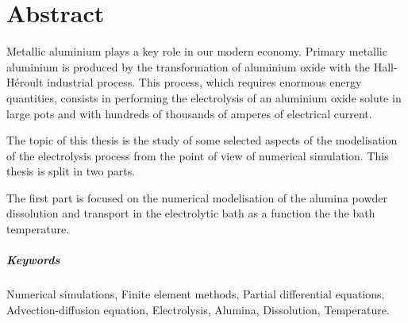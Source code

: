 \makeatletter
\@openrightfalse
\makeatother


\chapter*{Abstract}

Metallic aluminium plays a key role in our modern economy. Primary
metallic aluminium is produced by the transformation of aluminium
oxide with the Hall-Héroult industrial process. This process, which
requires enormous energy quantities, consists in performing the
electrolysis of an aluminium oxide solute in large pots and with
hundreds of thousands of amperes of electrical current.

The topic of this thesis is the study of some selected aspects of the
modelisation of the electrolysis process from the point of view of
numerical simulation. This thesis is split in two parts.

The first part is focused on the numerical modelisation of the alumina
powder dissolution and transport in the electrolytic bath as a
function the the bath temperature.

\paragraph{Keywords}
Numerical simulations,
Finite element methods,
Partial differential equations,
Advection-diffusion equation,
Electrolysis,
Alumina,
Dissolution,
Temperature.


\makeatletter
\@openrighttrue
\makeatother

